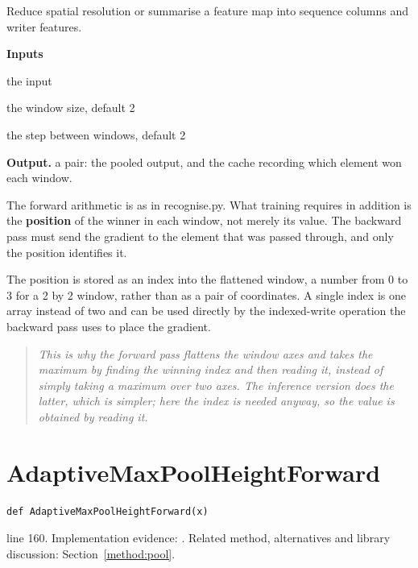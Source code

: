 Reduce spatial resolution or summarise a feature map into sequence columns and writer features.




\noindent\textbf{Inputs}
\begin{description}[leftmargin=2.2em,style=nextline,font=\normalfont\ttfamily]\setlength\itemsep{1pt}
  \item[{x}] \normalfont the input
  \item[{kernel}] \normalfont the window size, default 2
  \item[{stride}] \normalfont the step between windows, default 2
\end{description}

\noindent\textbf{Output.} a pair: the pooled output, and the cache recording which element won each window.


The forward arithmetic is as in recognise.py. What training requires in addition is the \textbf{position} of the winner in each window, not merely its value. The backward pass must send the gradient to the element that was passed through, and only the position identifies it.

The position is stored as an index into the flattened window, a number from 0 to 3 for a 2 by 2 window, rather than as a pair of coordinates. A single index is one array instead of two and can be used directly by the indexed-write operation the backward pass uses to place the gradient.


\begin{quote}\small\itshape This is why the forward pass flattens the window axes and takes the maximum by finding the winning index and then reading it, instead of simply taking a maximum over two axes. The inference version does the latter, which is simpler; here the index is needed anyway, so the value is obtained by reading it.\end{quote}


\section{AdaptiveMaxPoolHeightForward}\label{fn:train:AdaptiveMaxPoolHeightForward}
\begin{lstlisting}[style=sig]
def AdaptiveMaxPoolHeightForward(x)
\end{lstlisting}
 line 160. Implementation evidence: \cite{code2026}. Related method, alternatives and library discussion: Section~\ref{method:pool}.


